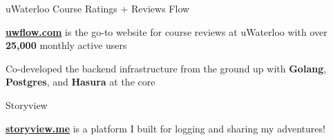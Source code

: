 
\begin{cventries}
  \cventry
    {uWaterloo Course Ratings + Reviews} %
    {Flow} %
    {} %
    {} %
    {
      \begin{cvitems} %
        \item {\href{https://uwflow.com}{\textbf{uwflow.com}} is the go-to website for course reviews at uWaterloo with over \textbf{25,000} monthly active users}
        \item {Co-developed the backend infrastructure from the ground up with \textbf{Golang}, \textbf{Postgres}, and \textbf{Hasura} at the core}
      \end{cvitems}
    }

  \cventry
    {} %
    {Storyview} %
    {} %
    {} %
    {
      \begin{cvitems} %
        \item {\href{https://www.storyview.me/}{\textbf{storyview.me}} is a platform I built for logging and sharing my adventures!}
      \end{cvitems}
    }


\end{cventries}